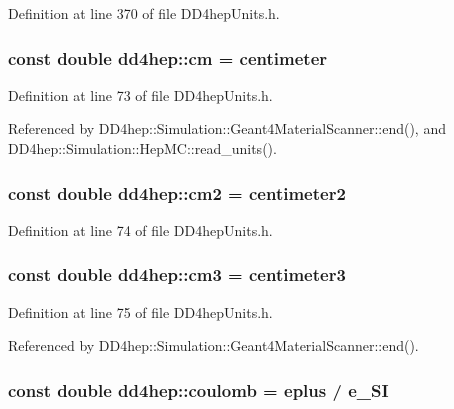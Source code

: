 Definition at line 370 of file DD4hepUnits.h.\hypertarget{namespacedd4hep_a1f3cfefacfa8c2174102824c534c71b8}{
\subsubsection[{cm}]{\setlength{\rightskip}{0pt plus 5cm}const double {\bf dd4hep::cm} = {\bf centimeter}}}
\label{namespacedd4hep_a1f3cfefacfa8c2174102824c534c71b8}


Definition at line 73 of file DD4hepUnits.h.

Referenced by DD4hep::Simulation::Geant4MaterialScanner::end(), and DD4hep::Simulation::HepMC::read\_\-units().\hypertarget{namespacedd4hep_aaa4f14a45d39e83ade706dcfce865a35}{
\subsubsection[{cm2}]{\setlength{\rightskip}{0pt plus 5cm}const double {\bf dd4hep::cm2} = {\bf centimeter2}}}
\label{namespacedd4hep_aaa4f14a45d39e83ade706dcfce865a35}


Definition at line 74 of file DD4hepUnits.h.\hypertarget{namespacedd4hep_a6464c11bda4aa7d6c4d42f70dbcaf803}{
\subsubsection[{cm3}]{\setlength{\rightskip}{0pt plus 5cm}const double {\bf dd4hep::cm3} = {\bf centimeter3}}}
\label{namespacedd4hep_a6464c11bda4aa7d6c4d42f70dbcaf803}


Definition at line 75 of file DD4hepUnits.h.

Referenced by DD4hep::Simulation::Geant4MaterialScanner::end().\hypertarget{namespacedd4hep_a399f2340c615066766d822ce9c9781b7}{
\subsubsection[{coulomb}]{\setlength{\rightskip}{0pt plus 5cm}const double {\bf dd4hep::coulomb} = {\bf eplus} / {\bf e\_\-SI}}}
\label{namespacedd4hep_a399f2340c615066766d822ce9c9781b7}


